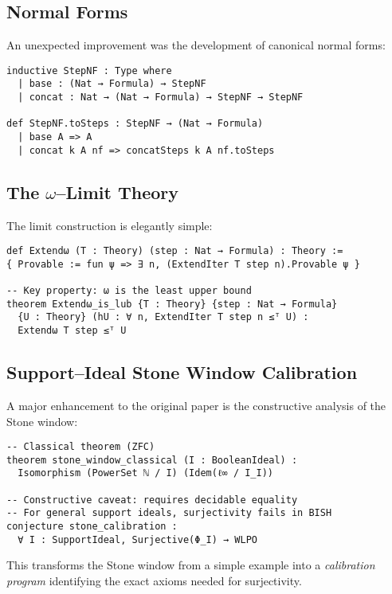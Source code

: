 \documentclass[11pt]{article}
\theoremstyle{definition}
\theoremstyle{remark}
\begin{document}
\subsection{Normal Forms}

An unexpected improvement was the development of canonical normal forms:

\begin{lstlisting}[language={}]
inductive StepNF : Type where
  | base : (Nat → Formula) → StepNF
  | concat : Nat → (Nat → Formula) → StepNF → StepNF

def StepNF.toSteps : StepNF → (Nat → Formula)
  | base A => A
  | concat k A nf => concatSteps k A nf.toSteps
\end{lstlisting}

\subsection{The $\omega$--Limit Theory}

The limit construction is elegantly simple:

\begin{lstlisting}[language={}]
def Extendω (T : Theory) (step : Nat → Formula) : Theory :=
{ Provable := fun ψ => ∃ n, (ExtendIter T step n).Provable ψ }

-- Key property: ω is the least upper bound
theorem Extendω_is_lub {T : Theory} {step : Nat → Formula} 
  {U : Theory} (hU : ∀ n, ExtendIter T step n ≤ᵀ U) :
  Extendω T step ≤ᵀ U
\end{lstlisting}

\subsection{Support--Ideal Stone Window Calibration}

A major enhancement to the original paper is the constructive analysis of the Stone window:

\begin{lstlisting}[language={}]
-- Classical theorem (ZFC)
theorem stone_window_classical (I : BooleanIdeal) :
  Isomorphism (PowerSet ℕ / I) (Idem(ℓ∞ / I_I))

-- Constructive caveat: requires decidable equality
-- For general support ideals, surjectivity fails in BISH
conjecture stone_calibration :
  ∀ I : SupportIdeal, Surjective(Φ_I) → WLPO
\end{lstlisting}

This transforms the Stone window from a simple example into a \emph{calibration program} identifying the exact axioms needed for surjectivity.
\end{document}

